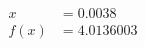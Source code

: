\documentclass[preview]{standalone}
\begin{document}
\begin{align*}
x &= 0.0038\\f(x) &= 4.0136003
\end{align*}
\end{document}
